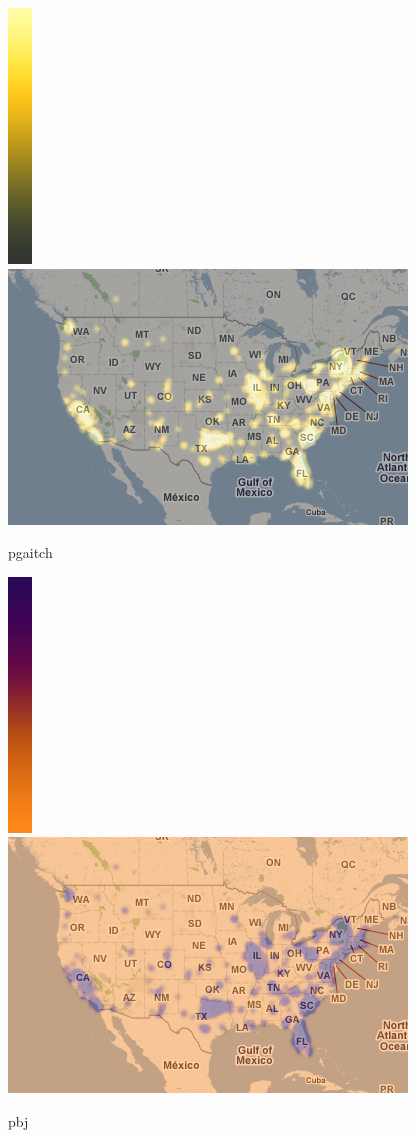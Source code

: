 \documentclass{manual}
\begin{document}
\begin{figure}[htp]
\includegraphics[bb=0 0 24 256]{color-schemes/pgaitch.png}
\includegraphics[bb=0 0 400 256]{img/cs-pgaitch.png}
\caption{pgaitch}\label{fig:pgaitch}
\end{figure}

\begin{figure}[htp]
\includegraphics[bb=0 0 24 256]{color-schemes/pbj.png}
\includegraphics[bb=0 0 400 256]{img/cs-pbj.png}
\caption{pbj}\label{fig:pbj}
\end{figure}
\end{document}
